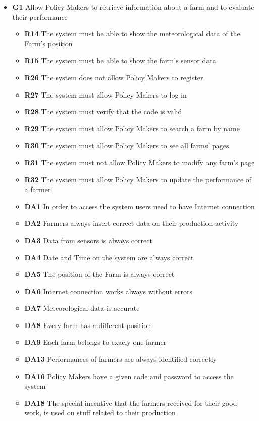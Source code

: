 \begin{itemize}   
    \item \textbf{G1} Allow Policy Makers to retrieve information about a farm and to evaluate their performance
        \begin{itemize}
            \renewcommand\labelitemi{--}
            \item \textbf{R14} The system must be able to show the meteorological data of the Farm’s position
            \item \textbf{R15} The system must be able to show the farm’s sensor data
            \item \textbf{R26} The system does not allow Policy Makers to register
            \item \textbf{R27} The system must allow Policy Makers to log in
            \item \textbf{R28} The system must verify that the code is valid
            \item \textbf{R29} The system must allow Policy Makers to search a farm by name
            \item \textbf{R30} The system must allow Policy Makers to see all farms’ pages
            \item \textbf{R31} The system must not allow Policy Makers to modify any farm’s page
            \item \textbf{R32} The system must allow Policy Makers to update the performance of a farmer
            \item \textbf{DA1} In order to access the system users need to have Internet connection
            \item \textbf{DA2} Farmers always insert correct data on their production activity
            \item \textbf{DA3} Data from sensors is always correct
            \item \textbf{DA4} Date and Time on the system are always correct
            \item \textbf{DA5} The position of the Farm is always correct
            \item \textbf{DA6} Internet connection works always without errors
            \item \textbf{DA7} Meteorological data is accurate
            \item \textbf{DA8} Every farm has a different position
            \item \textbf{DA9} Each farm belongs to exacly one farmer
            \item \textbf{DA13} Performances of farmers are always identified correctly
            \item \textbf{DA16} Policy Makers have a given code and password to access the system
            \item \textbf{DA18} The special incentive that the farmers received for their good work, is used on stuff related to their production
        \end{itemize}
    

\end{itemize}
